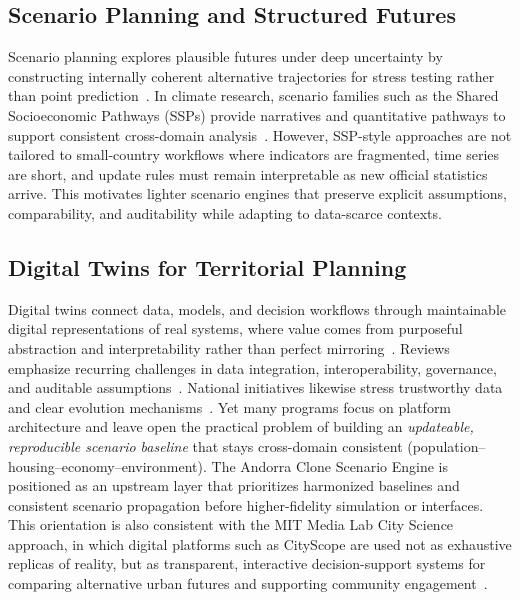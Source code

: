 \documentclass[urbansci,article,submit,pdftex,moreauthors]{Definitions/mdpi}
\begin{document}
\subsection{Scenario Planning and Structured Futures}

Scenario planning explores plausible futures under deep uncertainty by
constructing internally coherent alternative trajectories for stress testing
rather than point prediction~\cite{amer2013scenario}. In climate research,
scenario families such as the Shared Socioeconomic Pathways (SSPs) provide
narratives and quantitative pathways to support consistent cross-domain
analysis~\cite{riahi2017ssps,oneill2014ssp}. However, SSP-style approaches are
not tailored to small-country workflows where indicators are fragmented, time
series are short, and update rules must remain interpretable as new official
statistics arrive. This motivates lighter scenario engines that preserve
explicit assumptions, comparability, and auditability while adapting to
data-scarce contexts.

\subsection{Digital Twins for Territorial Planning}

Digital twins connect data, models, and decision workflows through maintainable
digital representations of real systems, where value comes from purposeful
abstraction and interpretability rather than perfect
mirroring~\cite{batty2018digitaltwins}. Reviews emphasize recurring challenges
in data integration, interoperability, governance, and auditable
assumptions~\cite{udtreview2024}. National initiatives likewise stress
trustworthy data and clear evolution
mechanisms~\cite{cdbb2018gemini,ndtp2024principles}. Yet many programs focus on
platform architecture and leave open the practical problem of building an
\emph{updateable, reproducible scenario baseline} that stays cross-domain
consistent (population--housing--economy--environment). The Andorra Clone
Scenario Engine is positioned as an upstream layer that prioritizes harmonized
baselines and consistent scenario propagation before higher-fidelity simulation
or interfaces. This orientation is also consistent with the MIT Media Lab City
Science approach, in which digital platforms such as CityScope are used not as
exhaustive replicas of reality, but as transparent, interactive
decision-support systems for comparing alternative urban futures and supporting
community engagement~\cite{grignard2018cityscope,berke2022using}.
\end{document}
